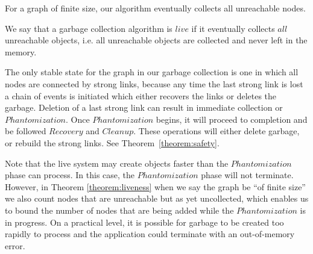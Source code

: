 \begin{theorem}[Liveness]
\label{theorem:liveness}
For a graph of finite size, our algorithm eventually collects all unreachable nodes.
\end{theorem}
\begin{proofs}
We say that a garbage collection algorithm is $live$ if it eventually collects
$all$ unreachable objects, i.e. all unreachable objects are collected and never
left in the memory.

The only stable state for the graph in our garbage collection is one in which all nodes
are connected by strong links, because any time the last strong link is lost a chain of
events is initiated which either recovers the links or deletes the garbage. Deletion of
a last strong link can result in immediate collection or $Phantomization.$ Once $Phantomization$
begins, it will proceed to completion and be followed $Recovery$ and $Cleanup.$ These
operations will either delete garbage, or rebuild the strong links. See Theorem~\ref{theorem:safety}.
\end{proofs}

Note that the live system may create objects faster than the
$Phantomization$ phase can process. In this case, the $Phantomization$ phase will
not terminate.
However, in Theorem \ref{theorem:liveness} when we say the graph be ``of finite size'' we
also count nodes that are unreachable but as yet uncollected,
which enables us to bound the number of nodes that are being added while the $Phantomization$ is in progress.
On a practical level, it is possible for garbage to be
created too rapidly to process and the application could terminate with an out-of-memory error.

